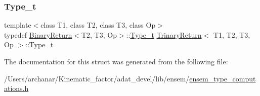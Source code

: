 \mbox{\label{structTrinaryReturn_ac67f5482a7fd12139d0cc6b5ec1cc374}} 
\subsubsection{\texorpdfstring{Type\_t}{Type\_t}\hspace{0.1cm}{\footnotesize\ttfamily [2/2]}}
{\footnotesize\ttfamily template$<$class T1, class T2, class T3, class Op$>$ \\
typedef \mbox{\hyperlink{structBinaryReturn}{Binary\+Return}}$<$T2, T3, Op$>$\+::\mbox{\hyperlink{structTrinaryReturn_ac67f5482a7fd12139d0cc6b5ec1cc374}{Type\+\_\+t}} \mbox{\hyperlink{structTrinaryReturn}{Trinary\+Return}}$<$ T1, T2, T3, Op $>$\+::\mbox{\hyperlink{structTrinaryReturn_ac67f5482a7fd12139d0cc6b5ec1cc374}{Type\+\_\+t}}}



The documentation for this struct was generated from the following file\+:\begin{DoxyCompactItemize}
\item 
/\+Users/archanar/\+Kinematic\+\_\+factor/adat\+\_\+devel/lib/ensem/\mbox{\hyperlink{lib_2ensem_2ensem__type__computations_8h}{ensem\+\_\+type\+\_\+computations.\+h}}\end{DoxyCompactItemize}
